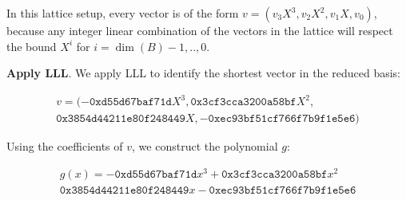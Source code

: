 \documentclass[a4paper,12pt]{report}
\begin{document}
In this lattice setup, every vector is of the form $v = (v_3X^3, v_2X^2, v_1X, v_0)$, because any integer linear combination of the vectors in the lattice will respect the bound $X^i$ for $i=\dim(B)-1,..,0$.

\textbf{Apply LLL}. We apply LLL to identify the shortest vector in the reduced basis:

\[
    \begin{split}
    v = (-\texttt{0xd55d67baf71d}X^3, \texttt{0x3cf3cca3200a58bf}X^2, \\
    \texttt{0x3854d44211e80f248449}X, -\texttt{0xec93bf51cf766f7b9f1e5e6})
    \end{split}
\]

Using the coefficients of $v$, we construct the polynomial $g$:

\[
    \begin{split}
        g(x) = -\texttt{0xd55d67baf71d}x^3 +  \texttt{0x3cf3cca3200a58bf}x^2 \\
        \texttt{0x3854d44211e80f248449}x -\texttt{0xec93bf51cf766f7b9f1e5e6}
    \end{split}
\]
\end{document}
